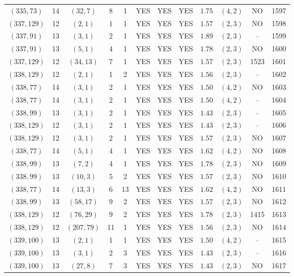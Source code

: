 \begin{longtable}{|c|c|c|c|c|c|c|c|c|c|c|c|}
$(335,73)$ & 14 & $(32,7)$ & 8 & 1 & YES & YES & YES & $1.75$ & $(4,2)$ & NO & 1597\\
$(337,129)$ & 12 & $(2,1)$ & 1 & 1 & YES & YES & YES & $1.57$ & $(2,3)$ & NO & 1598\\
$(337,91)$ & 13 & $(3,1)$ & 2 & 1 & YES & YES & YES & $1.89$ & $(2,3)$ & -- & 1599\\
$(337,91)$ & 13 & $(5,1)$ & 4 & 1 & YES & YES & YES & $1.78$ & $(2,3)$ & NO & 1600\\
$(337,129)$ & 12 & $(34,13)$ & 7 & 1 & YES & YES & YES & $1.57$ & $(2,3)$ & 1523 & 1601\\
$(338,129)$ & 12 & $(2,1)$ & 1 & 2 & YES & YES & YES & $1.56$ & $(2,3)$ & -- & 1602\\
$(338,77)$ & 14 & $(3,1)$ & 2 & 1 & YES & YES & YES & $1.50$ & $(4,2)$ & NO & 1603\\
$(338,77)$ & 14 & $(3,1)$ & 2 & 1 & YES & YES & YES & $1.50$ & $(4,2)$ & -- & 1604\\
$(338,99)$ & 13 & $(3,1)$ & 2 & 1 & YES & YES & YES & $1.43$ & $(2,3)$ & -- & 1605\\
$(338,129)$ & 12 & $(3,1)$ & 2 & 1 & YES & YES & YES & $1.43$ & $(2,3)$ & -- & 1606\\
$(338,129)$ & 12 & $(3,1)$ & 2 & 1 & YES & YES & YES & $1.57$ & $(2,3)$ & NO & 1607\\
$(338,77)$ & 14 & $(5,1)$ & 4 & 1 & YES & YES & YES & $1.62$ & $(4,2)$ & NO & 1608\\
$(338,99)$ & 13 & $(7,2)$ & 4 & 1 & YES & YES & YES & $1.78$ & $(2,3)$ & NO & 1609\\
$(338,99)$ & 13 & $(10,3)$ & 5 & 2 & YES & YES & YES & $1.57$ & $(2,3)$ & NO & 1610\\
$(338,77)$ & 14 & $(13,3)$ & 6 & 13 & YES & YES & YES & $1.62$ & $(4,2)$ & NO & 1611\\
$(338,99)$ & 13 & $(58,17)$ & 9 & 2 & YES & YES & YES & $1.57$ & $(2,3)$ & NO & 1612\\
$(338,129)$ & 12 & $(76,29)$ & 9 & 2 & YES & YES & YES & $1.78$ & $(2,3)$ & 1415 & 1613\\
$(338,129)$ & 12 & $(207,79)$ & 11 & 1 & YES & YES & YES & $1.56$ & $(2,3)$ & NO & 1614\\
$(339,100)$ & 13 & $(2,1)$ & 1 & 1 & YES & YES & YES & $1.50$ & $(4,2)$ & -- & 1615\\
$(339,100)$ & 13 & $(3,1)$ & 2 & 3 & YES & YES & YES & $1.43$ & $(2,3)$ & -- & 1616\\
$(339,100)$ & 13 & $(27,8)$ & 7 & 3 & YES & YES & YES & $1.43$ & $(2,3)$ & NO & 1617\\

\end{longtable}
